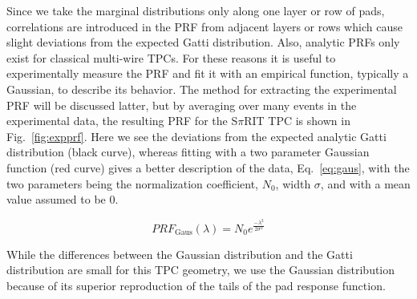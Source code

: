 Since we take the marginal distributions only along one layer or row of pads, correlations are introduced in the PRF from adjacent layers or rows which cause slight deviations from the expected Gatti distribution. Also, analytic PRFs only exist for classical multi-wire TPCs. For these reasons it is useful to experimentally measure the PRF and fit it with an empirical function, typically a Gaussian, to describe its behavior. The method for extracting the experimental PRF will be discussed latter, but by averaging over many events in the experimental data, the resulting PRF for the S$\pi$RIT TPC is shown in Fig.~\ref{fig:expprf}. Here we see the deviations from the expected analytic Gatti distribution (black curve), whereas fitting with a two parameter Gaussian function (red curve) gives a better description of the  data, Eq.~\ref{eq:gaus}, with the two parameters being the normalization coefficient, $N_0$, width $\sigma$, and with a mean value assumed to be 0.

\begin{equation}\label{eq:prfgaus}
PRF_{\mathrm{Gaus}}(\lambda) = N_0 e^\frac{-\lambda^2}{2\sigma^2}
\end{equation}

While the differences between the Gaussian distribution and the Gatti distribution are small for this TPC geometry, we use the Gaussian distribution because of its superior reproduction of the tails of the pad response function.   



\begin{comment}
\subsection{Considerations when constructing a TPC}
Several considerations went into the construction of the S$\pi$RI TPC which I wish to summarize and document here. All materials and glues of the TPC were selected as low out-gassing materials. Several materials (that are common place in nuclear labs), such as vacuum grease, viton o-rings, all out-gas organic chemicals into the counter gas which damage the TPC by permanently lowering the gain over time. The organic molecules responsible are difficult to identify exactly, but lists of good and bad materials are well known in the literature from experiments. If a material we wished to used was not on these lists we placed the material in a clean chamber with the counter gas and flowed this counter gas through a small proportional counter making sure the gain did not drop at high collection rates when exposed to a high rate alpha Americium source. 

Sparking
Two volumes of gas. 
\end{comment}


